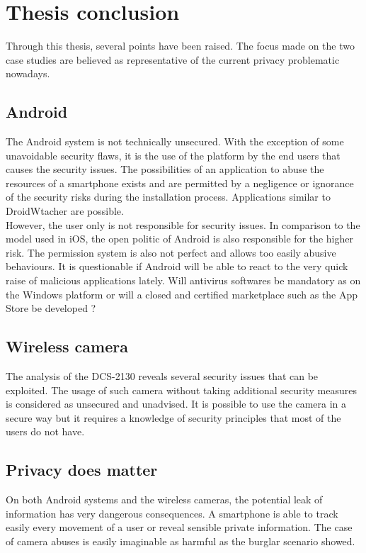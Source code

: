 \chapter{Thesis conclusion}

Through this thesis, several points have been raised.
The focus made on the two case studies are believed as representative of the current privacy problematic nowadays.

\section{Android}

The Android system is not technically unsecured.
With the exception of some unavoidable security flaws, it is the use of the platform by the end users that causes the security issues.
The possibilities of an application to abuse the resources of a smartphone exists and are permitted by a negligence or ignorance of the security risks during the installation process.
Applications similar to DroidWtacher are possible.\\

However, the user only is not responsible for security issues.
In comparison to the model used in iOS, the open politic of Android is also responsible for the higher risk.
The permission system is also not perfect and allows too easily abusive behaviours.
It is questionable if Android will be able to react to the very quick raise of malicious applications lately.
Will antivirus softwares be mandatory as on the Windows platform or will a closed and certified marketplace such as the App Store be developed ?

\section{Wireless camera}

The analysis of the DCS-2130 reveals several security issues that can be exploited.
The usage of such camera without taking additional security measures is  considered as unsecured and unadvised.
It is possible to use the camera in a secure way but it requires a knowledge of security principles that most of the users do not have.

\section{Privacy does matter}

On both Android systems and the wireless cameras, the potential leak of information has very dangerous consequences.
A smartphone is able to track easily every movement of a user or reveal sensible private information.
The case of camera abuses is easily imaginable as harmful as the burglar scenario showed.\\

